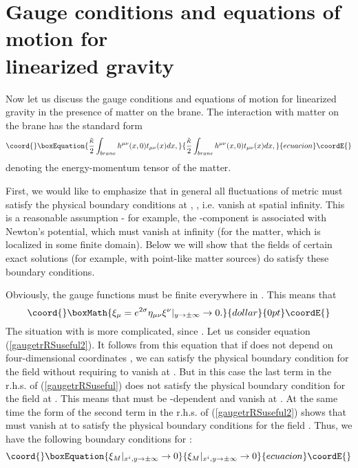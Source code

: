 \documentclass[a4paper,12pt]{article}
\begin{document}
\section{Gauge conditions and equations of motion for \\ linearized gravity}
Now let us discuss the gauge conditions  and equations of motion
for linearized gravity in the presence of matter on the brane.
The interaction with matter on the brane has the standard form
\begin{equation}\coord{}\boxEquation{\label{interaction}
 \frac{\hat \kappa}{2} \int_{brane} h^{\mu\nu}(x,0) t_{\mu\nu}(x) dx,
}{\frac{\hat \kappa}{2} \int_{brane} h^{\mu\nu}(x,0) t_{\mu\nu}(x) dx,
}{ecuacion}\coordE{}\end{equation}
\coordHE{} denoting the energy-momentum tensor of the matter.

First, we would like to emphasize that in general all fluctuations of
metric must satisfy the physical boundary conditions at  \coordHE{},
\coordHE{}, i.e. vanish at spatial infinity. This
is a reasonable assumption - for example, the \coordHE{}-component is
associated with  Newton's potential, which must vanish at infinity (for the
matter, which is localized in some finite domain). Below we will show that
the fields of certain exact solutions (for example, with point-like matter
sources) do satisfy these boundary conditions.

Obviously, the gauge functions  \coordHE{} must be finite everywhere in
\coordHE{}. This means that $$\coord{}\boxMath{
\xi_{\mu}=e^{2\sigma}\eta_{\mu\nu}\xi^{\nu}|_{y\to\pm\infty} \to 0. }{dollar}{0pt}\coordE{}$$ The
situation with \coordHE{} is more complicated, since
\coordHE{}. Let us consider equation
(\ref{gaugetrRSuseful2}). It follows from this equation  that if \coordHE{}
does not depend on four-dimensional coordinates \coordHE{}, we can satisfy the
physical boundary condition for the field \coordHE{} without requiring
\coordHE{} to vanish at \coordHE{}. But in this case the last term in the
r.h.s. of (\ref{gaugetrRSuseful}) does not satisfy the physical boundary
condition for the field \coordHE{} at \coordHE{}. This means that
\coordHE{} must be \coordHE{}-dependent and vanish at \coordHE{}. At the same
time the form of the second term in the r.h.s. of (\ref{gaugetrRSuseful2})
shows that \coordHE{} must vanish at \coordHE{} to satisfy the physical
boundary conditions for the field \coordHE{}. Thus, we have the following
boundary conditions for \coordHE{}:
\begin{equation}\coord{}\boxEquation{
\xi_M|_{ x^i,y\to\pm\infty}\to 0
}{
\xi_M|_{ x^i,y\to\pm\infty}\to 0
}{ecuacion}\coordE{}\end{equation}
\end{document}
